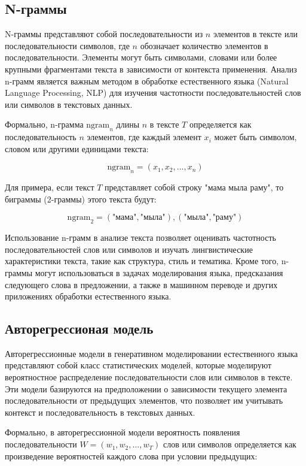 \subsection{N-граммы}

N-граммы представляют собой последовательности из \( n \) элементов в тексте или последовательности символов, где \( n \) обозначает количество элементов в последовательности. Элементы могут быть символами, словами или более крупными фрагментами текста в зависимости от контекста применения. Анализ n-грамм является важным методом в обработке естественного языка (Natural Language Processing, NLP) для изучения частотности последовательностей слов или символов в текстовых данных.

Формально, n-грамма \( \text{ngram}_n \) длины \( n \) в тексте \( T \) определяется как последовательность \( n \) элементов, где каждый элемент \( x_i \) может быть символом, словом или другими единицами текста:

\[ \text{ngram}_n = (x_1, x_2, ..., x_n) \]

Для примера, если текст \( T \) представляет собой строку "мама мыла раму", то биграммы (2-граммы) этого текста будут:

\[ \text{ngram}_2 = (\text{"мама"}, \text{"мыла"}), (\text{"мыла"}, \text{"раму"}) \]

Использование n-грамм в анализе текста позволяет оценивать частотность последовательностей слов или символов и изучать лингвистические характеристики текста, такие как структура, стиль и тематика. Кроме того, n-граммы могут использоваться в задачах моделирования языка, предсказания следующего слова в предложении, а также в машинном переводе и других приложениях обработки естественного языка.

\subsection{Авторегрессионая модель}


Авторегрессионные модели в генеративном моделировании естественного языка представляют собой класс статистических моделей, которые моделируют вероятностное распределение последовательности слов или символов в тексте. Эти модели базируются на предположении о зависимости текущего элемента последовательности от предыдущих элементов, что позволяет им учитывать контекст и последовательность в текстовых данных.

Формально, в авторегрессионной модели вероятность появления последовательности \( W = (w_1, w_2, ..., w_T) \) слов или символов определяется как произведение вероятностей каждого слова при условии предыдущих:


